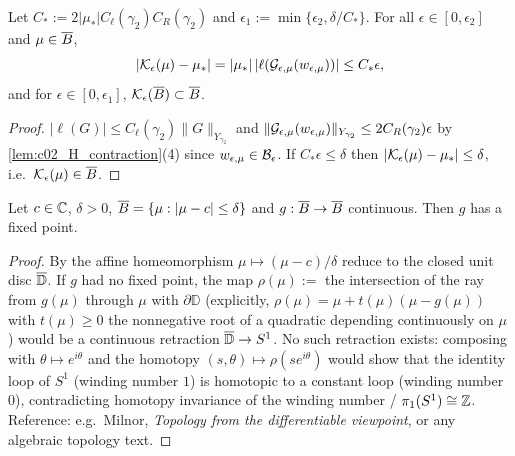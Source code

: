 \begin{lemma}
  \label{lem:c02_K_self_map}
  Let $C_*:=2|\mu_*|C_\ell(\gamma_2)C_R(\gamma_2)$ and $\epsilon_1:=\min\{\epsilon_2,\delta/C_*\}$. For all $\epsilon\in[0,\epsilon_2]$ and $\mu\in\overline{B}$,
  \begin{equation}\label{eqn:fixed_point_obstruction_bound}
    |\mathcal{K}_\epsilon(\mu)-\mu_*|=|\mu_*|\,|\ell(\mathcal{G}_{\epsilon,\mu}(w_{\epsilon,\mu}))|\le C_*\epsilon,
  \end{equation}
  and for $\epsilon\in[0,\epsilon_1]$, $\mathcal{K}_\epsilon(\overline{B})\subset\overline{B}$.
\end{lemma}
\begin{proof}
  $|\ell(G)|\le C_\ell(\gamma_2)\|G\|_{Y_{\gamma_2}}$ and $\|\mathcal{G}_{\epsilon,\mu}(w_{\epsilon,\mu})\|_{Y_{\gamma_2}}\le2C_R(\gamma_2)\epsilon$ by \cref{lem:c02_H_contraction}(4) since
  $w_{\epsilon,\mu}\in\mathcal{B}_\epsilon$. If $C_*\epsilon\le\delta$ then $|\mathcal{K}_\epsilon(\mu)-\mu_*|\le\delta$, i.e.\ $\mathcal{K}_\epsilon(\mu)\in\overline{B}$.
\end{proof}

\begin{lemma}
  \label{lem:c02_brouwer_disc}
  Let $c\in\mathbb{C}$, $\delta>0$, $\overline{B}=\{\mu:|\mu-c|\le\delta\}$ and $g:\overline{B}\to\overline{B}$ continuous. Then $g$ has a fixed point.
\end{lemma}
\begin{proof}
  By the affine homeomorphism $\mu\mapsto(\mu-c)/\delta$ reduce to the closed unit disc $\overline{\mathbb D}$. If $g$ had no
  fixed point, the map $\rho(\mu):=$ the intersection of the ray from $g(\mu)$ through $\mu$ with $\partial\mathbb D$ (explicitly,
  $\rho(\mu)=\mu+t(\mu)(\mu-g(\mu))$ with $t(\mu)\ge0$ the nonnegative root of a quadratic depending continuously on $\mu$)
  would be a continuous retraction $\overline{\mathbb D}\to S^1$. No such retraction exists: composing with
  $\theta\mapsto e^{i\theta}$ and the homotopy $(s,\theta)\mapsto\rho(se^{i\theta})$ would show that the identity loop of $S^1$
  (winding number $1$) is homotopic to a constant loop (winding number $0$), contradicting homotopy
  invariance of the winding number / $\pi_1(S^1)\cong\mathbb{Z}$. Reference: e.g.\ Milnor, \emph{Topology from the
  differentiable viewpoint}, or any algebraic topology text.
\end{proof}

